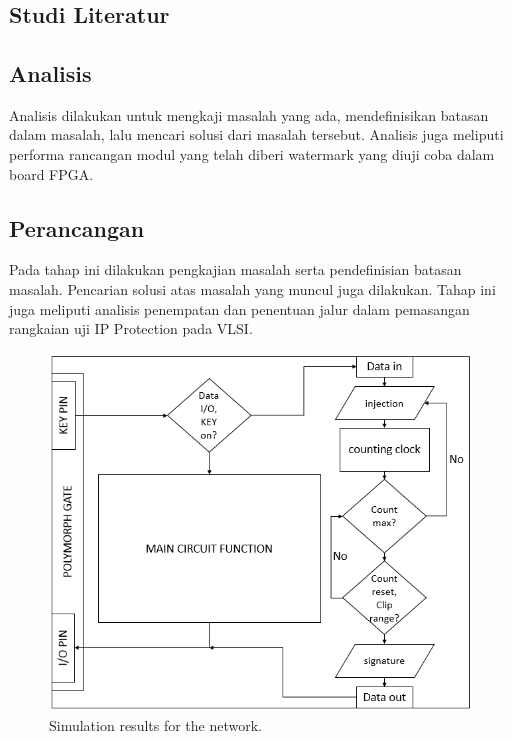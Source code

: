 \chapter{\babTiga}

\section{Studi Literatur}

\section{Analisis}

Analisis dilakukan untuk mengkaji masalah yang ada, mendefinisikan
batasan dalam masalah, lalu mencari solusi dari masalah tersebut. Analisis juga
meliputi performa rancangan modul yang telah diberi watermark yang diuji coba
dalam board FPGA.

\section{Perancangan}

Pada tahap ini dilakukan pengkajian masalah serta pendefinisian batasan
masalah. Pencarian solusi atas masalah yang muncul juga dilakukan. Tahap ini
juga meliputi analisis penempatan dan penentuan jalur dalam pemasangan
rangkaian uji IP Protection pada VLSI.

\begin{figure}[h]
	\centering
	\includegraphics[scale=0.6]{images/flow}
	\caption{Simulation results for the network.}
	\label{fig_sim}
\end{figure}

